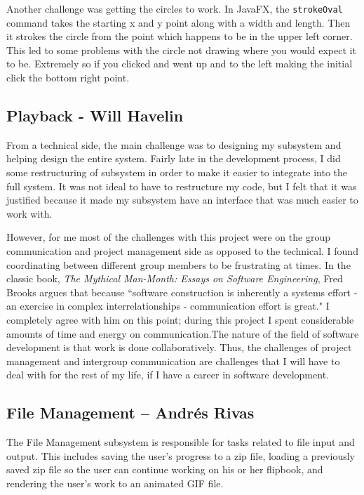 \documentclass[10 pt]{scrartcl}
\begin{document}
Another challenge was getting the circles to work. In JavaFX, the \verb|strokeOval| command takes the starting x and y point along with a width and length. Then it strokes the circle from the point which happens to be in the upper left corner. This led to some problems with the circle not drawing where you would expect it to be. Extremely so if you clicked and went up and to the left making the initial click the bottom right point.

\subsection{Playback - Will Havelin}

From a technical side, the main challenge was to designing my subsystem and helping design the entire system. Fairly late in the development process, I did some restructuring of subsystem in order to make it easier to integrate into the full system. It was not ideal to have to restructure my code, but I felt that it was justified because it made my subsystem have an interface that was much easier to work with.

However, for me most of the challenges with this project were on the group communication and project management side as opposed to the technical. I found coordinating between different group members to be frustrating at times. In the classic book, \emph{The Mythical Man-Month: Essays on Software Engineering}, Fred Brooks argues that because ``software construction is inherently a systems effort - an exercise in complex interrelationships - communication effort is great." I completely agree with him on this point; during this project I spent considerable amounts of time and energy on communication.The nature of the field of software development is that work is done collaboratively. Thus, the challenges of project management and intergroup communication are challenges that I will have to deal with for the rest of my life, if I have a career in software development.

\subsection{File Management -- Andr\'{e}s Rivas}

The File Management subsystem is responsible for tasks related to file input and output. This includes saving the user's progress to a zip file, loading a previously saved zip file so the user can continue working on his or her flipbook, and rendering the user's work to an animated GIF file.
\end{document}
